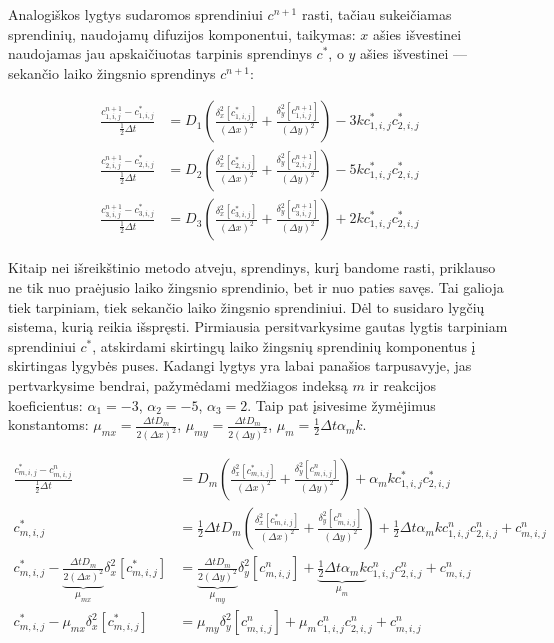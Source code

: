 Analogiškos lygtys sudaromos sprendiniui $c^{n+1}$ rasti, tačiau sukeičiamas sprendinių, naudojamų difuzijos komponentui, taikymas: $x$ ašies išvestinei naudojamas jau apskaičiuotas tarpinis sprendinys $c^{*}$, o $y$ ašies išvestinei — sekančio laiko žingsnio sprendinys $c^{n+1}$:

\begin{subequations} \label{eqs:adi-next-step}
\begin{align}
	\frac{c^{n+1}_{1,i,j} - c^*_{1,i,j}}{\frac{1}{2}\Delta t} 
	&= D_1 \left( \frac{\delta_x^2[c^{*}_{1,i,j}]}{(\Delta x)^2} 
	+ \frac{\delta_y^2[c^{n+1}_{1,i,j}]}{(\Delta y)^2} \right) - 3kc^*_{1,i,j}c^*_{2,i,j}\\
	\frac{c^{n+1}_{2,i,j} - c^*_{2,i,j}}{\frac{1}{2}\Delta t} 
	&= D_2 \left( \frac{\delta_x^2[c^*_{2,i,j}]}{(\Delta x)^2}
	+ \frac{\delta_y^2[c^{n+1}_{2,i,j}]}{(\Delta y)^2} \right) - 5kc^*_{1,i,j}c^*_{2,i,j}\\
	\frac{c^{n+1}_{3,i,j} - c^*_{3,i,j}}{\frac{1}{2}\Delta t} 
	&= D_3 \left( \frac{\delta_x^2[c^*_{3,i,j}]}{(\Delta x)^2} 
	+ \frac{\delta_y^2[c^{n+1}_{3,i,j}]}{(\Delta y)^2} \right) +2kc^*_{1,i,j}c^*_{2,i,j}
\end{align}
\end{subequations}

\newpage

Kitaip nei išreikštinio metodo atveju, sprendinys, kurį bandome rasti, priklauso ne tik nuo praėjusio laiko žingsnio sprendinio, bet ir nuo paties savęs. Tai galioja tiek tarpiniam, tiek sekančio laiko žingsnio sprendiniui. Dėl to susidaro lygčių sistema, kurią reikia išspręsti. Pirmiausia persitvarkysime gautas lygtis tarpiniam sprendiniui $c^*$, atskirdami skirtingų laiko žingsnių sprendinių komponentus į skirtingas lygybės puses. Kadangi lygtys yra labai panašios tarpusavyje, jas pertvarkysime bendrai, pažymėdami medžiagos indeksą $m$ ir reakcijos koeficientus: $\alpha_1 = -3$, $\alpha_2 = -5$, $\alpha_3 = 2$. Taip pat įsivesime žymėjimus konstantoms: $\mu_{mx} = \frac{\Delta t D_m}{2(\Delta x)^2}$, $\mu_{my} = \frac{\Delta t D_m}{2(\Delta y)^2}$, $\mu_m = \frac{1}{2} \Delta t \alpha_m k$.

\begin{align*}
  \frac{c^{*}_{m,i,j} - c^n_{m,i,j}}{\frac{1}{2}\Delta t} 
  &= D_m \left( \frac{\delta_x^2[c^{*}_{m,i,j}]}{(\Delta x)^2} 
  + \frac{\delta_y^2[c^n_{m,i,j}]}{(\Delta y)^2} \right) 
  + \alpha_mkc^*_{1,i,j}c^*_{2,i,j} \\
  c^*_{m,i,j} 
  &= \frac{1}{2}\Delta t D_m \left( \frac{\delta_x^2[c^{*}_{m,i,j}]}{(\Delta x)^2} 
  + \frac{\delta_y^2[c^n_{m,i,j}]}{(\Delta y)^2} \right)
  + \frac{1}{2}\Delta t \alpha_m kc^n_{1,i,j}c^n_{2,i,j} + c^n_{m,i,j}\\
  c^*_{m,i,j} - \underbrace{\frac{\Delta t D_m}{2(\Delta x)^2}}_{\mu_{mx}}\delta_x^2[c^{*}_{m,i,j}] 
  &= \underbrace{\frac{\Delta t D_m}{2(\Delta y)^2}}_{\mu_{my}}\delta_y^2[c^n_{m,i,j}]
  + \underbrace{\frac{1}{2}\Delta t \alpha_m k}_{\mu_m}c^n_{1,i,j}c^n_{2,i,j} + c^n_{m,i,j}\\
  c^*_{m,i,j} - \mu_{mx}\delta_x^2[c^{*}_{m,i,j}]
  &= \mu_{my}\delta_y^2[c^n_{m,i,j}] + \mu_m c^n_{1,i,j}c^n_{2,i,j} + c^n_{m,i,j}
\end{align*}

